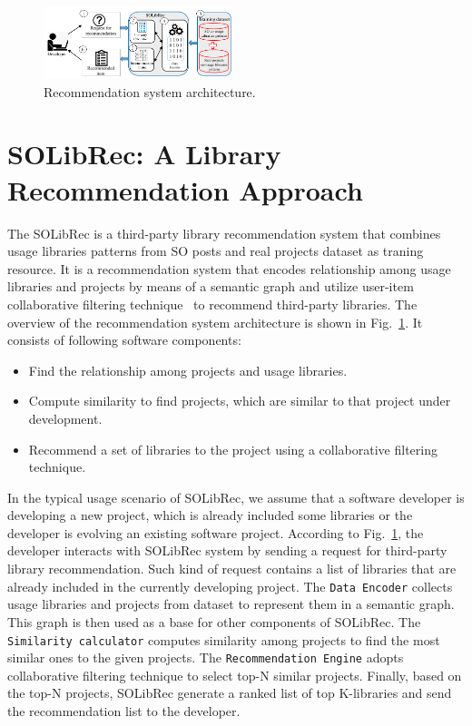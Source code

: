 \documentclass[paper]{ieice}
\begin{document}
\begin{figure}[ht]
	\centering
	\includegraphics[width=0.49\textwidth]{architecture.pdf}
	\caption{Recommendation system architecture.} 
	\label{fig:method}
\end{figure}

\section{SOLibRec: A Library Recommendation Approach}
\label{sec:SOLibRec}
The SOLibRec is a third-party library recommendation system that combines usage libraries patterns from SO posts and real projects dataset as traning resource.
It is a recommendation system that encodes relationship among usage libraries and projects by means of a semantic graph and utilize user-item collaborative filtering technique~\cite{schafer2007collaborative} to recommend third-party libraries. 
The overview of the recommendation system architecture is shown in Fig.~\ref{fig:method}. 
It consists of following software components:
\begin{itemize}
    \item Find the relationship among projects and usage libraries.
    \item Compute similarity to find projects, which are similar to that project under development.
    \item Recommend a set of libraries to the project using a collaborative filtering technique.
    
\end{itemize}

In the typical usage scenario of SOLibRec, we assume that a software developer is developing a new project, which is already included some libraries or the developer is evolving an existing software project.
According to Fig.~\ref{fig:method}, the developer interacts with SOLibRec system by sending a request for third-party library recommendation. 
Such kind of request contains a list of libraries that are already included in the currently developing project. 
The \texttt{Data Encoder} collects usage libraries and projects from dataset to represent them in a semantic graph. This graph is then used as a base for other components of SOLibRec.
The \texttt{Similarity calculator} computes similarity among projects to find the most similar ones to the given projects. 
The \texttt{Recommendation Engine} adopts collaborative filtering technique to select top-N similar projects. 
Finally, based on the top-N projects, SOLibRec generate a ranked list of top K-libraries and send the recommendation list to the developer.
\end{document}

